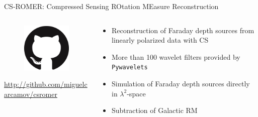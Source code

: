 \documentclass[xetex,aspectratio=169]{beamer}
\begin{document}
\begin{frame}{CS-ROMER: Compressed Sensing ROtation MEasure Reconstruction}
	\begin{columns}[onlytextwidth,t]
		\begin{column}{.5\textwidth}
			\begin{figure}
				\centering
				\includegraphics[scale=0.5]{figures/logos/GitHub-Mark-120px-plus.png}
			\end{figure}

			\url{http://github.com/miguelcarcamov/csromer}
		\end{column}
		\begin{column}{.5\textwidth}
			\begin{itemize}
				\item Reconstruction of Faraday depth sources from linearly polarized data with CS
				\item More than 100 wavelet filters provided by {\tt Pywavelets}
				\item Simulation of Faraday depth sources directly in $\lambda^2$-space
				\item Subtraction of Galactic RM

			\end{itemize}
		\end{column}%

	\end{columns}
\end{frame}
\end{document}
